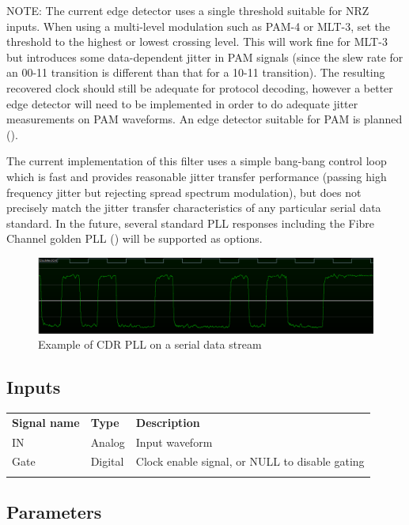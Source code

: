 NOTE: The current edge detector uses a single threshold suitable for NRZ inputs. When using a multi-level modulation
such as PAM-4 or MLT-3, set the threshold to the highest or lowest crossing level. This will work fine for MLT-3 but
introduces some data-dependent jitter in PAM signals (since the slew rate for an 00-11 transition is different than
that for a 10-11 transition). The resulting recovered clock should still be adequate for protocol decoding, however a
better edge detector will need to be implemented in order to do adequate jitter measurements on PAM waveforms. An edge
detector suitable for PAM is planned ().

The current implementation of this filter uses a simple bang-bang control loop which is fast and provides reasonable
jitter transfer performance (passing high frequency jitter but rejecting spread spectrum modulation), but does not
precisely match the jitter transfer characteristics of any particular serial data standard. In the future, several
standard PLL responses including the Fibre Channel golden PLL () will be supported as options.

\begin{figure}[h]
\centering
\includegraphics[width=16cm]{images/filters/cdrpll.png}
\caption{Example of CDR PLL on a serial data stream}
\label{filter_cdrpll}
\end{figure}

\subsection{Inputs}

\begin{tabularx}{16cm}{llX}
\thickhline
\textbf{Signal name} & \textbf{Type} & \textbf{Description} \\
\thickhline
IN & Analog & Input waveform \\
\thinhline
Gate & Digital & Clock enable signal, or NULL to disable gating\\
\thickhline
\end{tabularx}

\subsection{Parameters}


